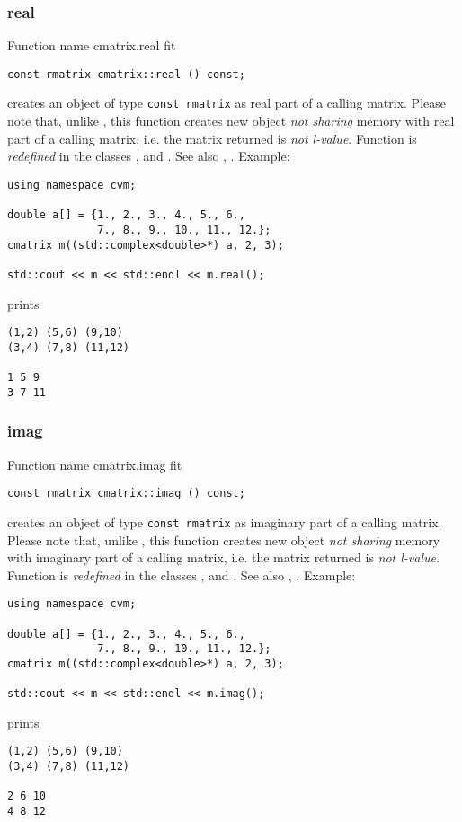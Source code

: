 \subsubsection{real}
Function%
\pdfdest name {cmatrix.real} fit
\begin{verbatim}
const rmatrix cmatrix::real () const;
\end{verbatim}
creates an object of type \verb"const rmatrix"
as  real part
of a calling matrix.
Please note that, unlike
, this
function creates new object \emph{not sharing}  memory
with real part of a calling matrix, i.e.
the matrix returned is \emph{not  l-value}.
Function is \emph{redefined} in the classes
,  and
.
See also
,
.
Example:
\begin{Verbatim}
using namespace cvm;

double a[] = {1., 2., 3., 4., 5., 6.,
              7., 8., 9., 10., 11., 12.};
cmatrix m((std::complex<double>*) a, 2, 3);

std::cout << m << std::endl << m.real();
\end{Verbatim}
prints
\begin{Verbatim}
(1,2) (5,6) (9,10)
(3,4) (7,8) (11,12)

1 5 9
3 7 11
\end{Verbatim}
\newpage




\subsubsection{imag}
Function%
\pdfdest name {cmatrix.imag} fit
\begin{verbatim}
const rmatrix cmatrix::imag () const;
\end{verbatim}
creates an object of type \verb"const rmatrix"
as  imaginary part
of a calling matrix.
Please note that, unlike
, this
function creates new object \emph{not sharing}  memory
with  imaginary part of a calling matrix, i.e.
the matrix returned is \emph{not  l-value}.
Function is \emph{redefined} in the classes
,  and
.
See also
,
.
Example:
\begin{Verbatim}
using namespace cvm;

double a[] = {1., 2., 3., 4., 5., 6.,
              7., 8., 9., 10., 11., 12.};
cmatrix m((std::complex<double>*) a, 2, 3);

std::cout << m << std::endl << m.imag();
\end{Verbatim}
prints
\begin{Verbatim}
(1,2) (5,6) (9,10)
(3,4) (7,8) (11,12)

2 6 10
4 8 12
\end{Verbatim}
\newpage





